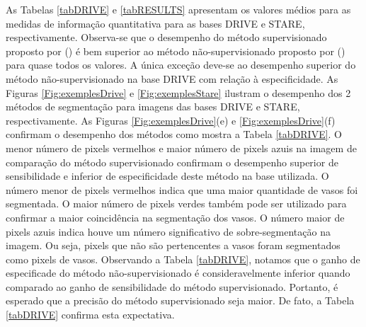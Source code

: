 As Tabelas \ref{tabDRIVE} e \ref{tabRESULTS} apresentam os valores m\'{e}dios para as medidas de informa\c{c}\~{a}o quantitativa para as bases DRIVE e STARE, respectivamente. Observa-se que o desempenho do m\'{e}todo supervisionado proposto por \citeauthor{Soares:2006} (\citeyear{Soares:2006}) \'{e} bem superior ao m\'{e}todo n\~{a}o-supervisionado proposto por \citeauthor{Zana:2001} (\citeyear{Zana:2001}) para quase todos os valores. A \'{u}nica exce\c{c}\~{a}o deve-se ao desempenho superior do m\'{e}todo n\~{a}o-supervisionado na base DRIVE com rela\c{c}\~{a}o \`{a} especificidade. As Figuras \ref{Fig:exemplesDrive} e \ref{Fig:exemplesStare} ilustram o desempenho dos 2  m\'{e}todos de segmenta\c{c}\~{a}o para imagens das bases DRIVE e STARE, respectivamente. As Figuras \ref{Fig:exemplesDrive}(e) e \ref{Fig:exemplesDrive}(f) confirmam o desempenho  dos m\'{e}todos como mostra a Tabela \ref{tabDRIVE}. O menor n\'{u}mero de pixels vermelhos e maior n\'{u}mero de pixels azuis na imagem de compara\c{c}\~{a}o do m\'{e}todo supervisionado confirmam o desempenho superior de sensibilidade e inferior de especificidade deste m\'{e}todo na base utilizada. O n\'{u}mero menor de pixels vermelhos indica que uma maior quantidade de vasos foi segmentada. O maior n\'{u}mero de pixels verdes tamb\'{e}m pode ser utilizado para confirmar a maior coincid\^{e}ncia na segmenta\c{c}\~{a}o dos vasos. O n\'{u}mero maior de pixels azuis indica houve um n\'{u}mero significativo de sobre-segmenta\c{c}\~{a}o na imagem. Ou seja, pixels que n\~{a}o s\~{a}o pertencentes a vasos foram segmentados como pixels de vasos. Observando a Tabela \ref{tabDRIVE}, notamos que o ganho de especificade do m\'{e}todo n\~{a}o-supervisionado \'{e} consideravelmente inferior quando comparado ao ganho de sensibilidade do m\'{e}todo supervisionado. Portanto, \'{e} esperado que a precis\~{a}o do m\'{e}todo supervisionado seja maior. De fato, a Tabela \ref{tabDRIVE} confirma esta expectativa.

